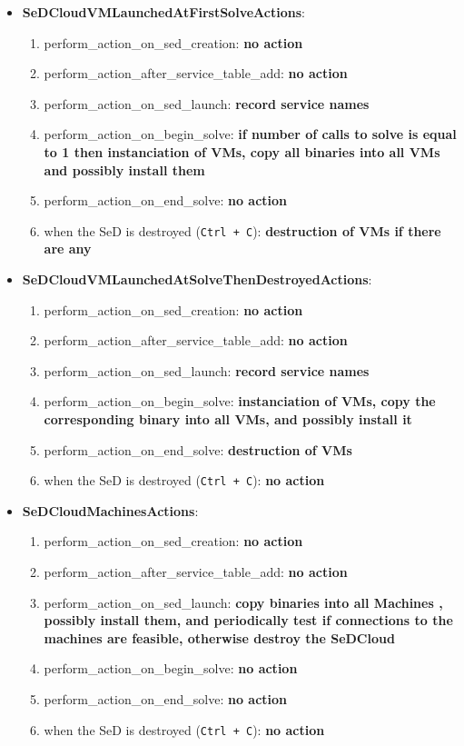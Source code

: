 \begin{itemize}
  \item \textbf{SeDCloudVMLaunchedAtFirstSolveActions}:
    \begin{enumerate}
        \item perform\_action\_on\_sed\_creation: \textbf{no action}
        \item perform\_action\_after\_service\_table\_add: \textbf{no action}
        \item perform\_action\_on\_sed\_launch: \textbf{record service names}
        \item perform\_action\_on\_begin\_solve: \textbf{if number of
          calls to solve is equal to 1 then instanciation of VMs, copy
          all binaries into all VMs and possibly install them}
        \item perform\_action\_on\_end\_solve: \textbf{no action}
        \item when the SeD is destroyed (\texttt{Ctrl + C}):
          \textbf{destruction of VMs if there are any}
      \end{enumerate}
  \item \textbf{SeDCloudVMLaunchedAtSolveThenDestroyedActions}:
    \begin{enumerate}
        \item perform\_action\_on\_sed\_creation: \textbf{no action}
        \item perform\_action\_after\_service\_table\_add: \textbf{no action}
        \item perform\_action\_on\_sed\_launch: \textbf{record service names}
        \item perform\_action\_on\_begin\_solve: \textbf{instanciation
          of VMs, copy the corresponding binary into all VMs, and
          possibly install it}
        \item perform\_action\_on\_end\_solve: \textbf{destruction of VMs}
        \item when the SeD is destroyed (\texttt{Ctrl + C}): \textbf{no action}
      \end{enumerate}
  \item \textbf{SeDCloudMachinesActions}:
    \begin{enumerate}
        \item perform\_action\_on\_sed\_creation: \textbf{no action}
        \item perform\_action\_after\_service\_table\_add: \textbf{no action}
        \item perform\_action\_on\_sed\_launch: \textbf{copy binaries
          into all Machines , possibly install them, and periodically
          test if connections to the machines are feasible, otherwise
          destroy the SeDCloud}
        \item perform\_action\_on\_begin\_solve: \textbf{no action}
        \item perform\_action\_on\_end\_solve: \textbf{no action}
        \item when the SeD is destroyed (\texttt{Ctrl + C}): \textbf{no action}
   \end{enumerate}


\end{itemize}
